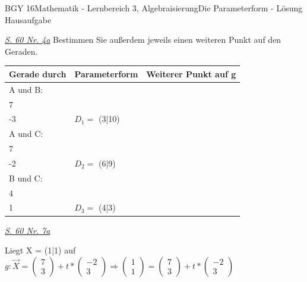\documentclass[oneside,openany,headings=optiontotoc,11pt,numbers=noenddot]{scrreprt}
\begin{document}
\begin{worksheet}{BGY 16}{Mathematik - Lernbereich 3, Algebraisierung}{Die Parameterform - Lösung Hausaufgabe}
		\begin{framed}
			\noindent
			\underline{\textit{S. 60 Nr. 4a}} Bestimmen Sie außerdem jeweils einen weiteren Punkt auf den Geraden.\\
			\par\noindent
			\begin{tabularx}{\textwidth}{lXX}
				Gerade durch & Parameterform & Weiterer Punkt auf g\\
				\hline
				A und B:&\(g: \vec{x} = \left(\begin{array}{c}2\\7\end{array}\right) + r*\left(\begin{array}{c}-1\\-3\end{array}\right)\) & \(D_1 =\) (3|10)\\
				A und C:&\(g: \vec{x} = \left(\begin{array}{c}2\\7\end{array}\right) + r*\left(\begin{array}{c}-4\\-2\end{array}\right)\) & \(D_2 =\) (6|9)\\
				B und C:&\(g: \vec{x} = \left(\begin{array}{c}1\\4\end{array}\right) + r*\left(\begin{array}{c}-3\\1\end{array}\right)\)& \(D_3 =\) (4|3)\\
			\end{tabularx}
			\noindent		
			\underline{\textit{S. 60 Nr. 7a}}\\
			\par\noindent
			Liegt X = (1|1) auf \(g: \vec{X} =\left(\begin{array}{c}7\\3\end{array}\right) + t*\left(\begin{array}{c}-2\\3\end{array}\right) \Rightarrow \left(\begin{array}{c}1\\1\end{array}\right) = \left(\begin{array}{c}7\\3\end{array}\right) + t*\left(\begin{array}{c}-2\\3\end{array}\right)\)

\end{framed}
\end{worksheet}
\end{document}

